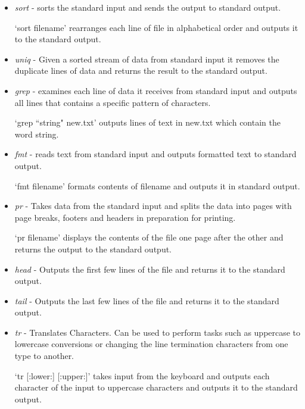 \documentclass{article}
\begin{document}
\begin{itemize}
\item \textit{sort} - sorts the standard input and sends the output to standard output.

\hspace{10mm} `sort filename' rearranges each line of file in alphabetical order and outputs it to the standard output.

\item \textit{uniq} - Given a sorted stream of data from standard input it removes the duplicate lines of data and returns the result to the standard output.

\item \textit{grep} - examines each line of data it receives from standard input and outputs all lines that contains a specific pattern of characters.

\hspace{10mm} `grep ``string" new.txt' outputs lines of text in new.txt which contain the word string.

\item \textit{fmt} - reads text from standard input and outputs formatted text to standard output.

\hspace{10mm} `fmt filename' formats contents of filename and outputs it in standard output.

\item \textit{pr} - Takes data from the standard input and splits the data into pages with page breaks, footers and headers in preparation for printing.

\hspace{10mm} `pr filename' displays the contents of the file one page after the other and returns the output to the standard output.

\item \textit{head} - Outputs the first few lines of the file and returns it to the standard output.

\item \textit{tail} - Outputs the last few lines of the file and returns it to the standard output.

\item \textit{tr} - Translates Characters. Can be used to perform tasks such as uppercase to lowercase conversions or changing the line termination characters from one type to another.

\hspace{10mm} `tr [:lower:] [:upper:]' takes input from the keyboard and outputs each character of the input to uppercase characters and outputs it to the standard output.

\end{itemize}
\end{document}

